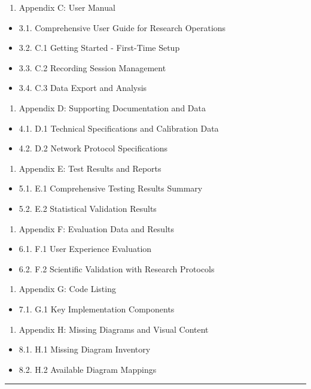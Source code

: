 \documentclass[11pt,a4paper]{article}
\begin{document}
\begin{enumerate}
\item Appendix C: User Manual
\end{enumerate}
\begin{itemize}
\item 3.1. Comprehensive User Guide for Research Operations
\item 3.2. C.1 Getting Started - First-Time Setup
\item 3.3. C.2 Recording Session Management
\item 3.4. C.3 Data Export and Analysis
\end{itemize}
\begin{enumerate}
\item Appendix D: Supporting Documentation and Data
\end{enumerate}
\begin{itemize}
\item 4.1. D.1 Technical Specifications and Calibration Data
\item 4.2. D.2 Network Protocol Specifications
\end{itemize}
\begin{enumerate}
\item Appendix E: Test Results and Reports
\end{enumerate}
\begin{itemize}
\item 5.1. E.1 Comprehensive Testing Results Summary
\item 5.2. E.2 Statistical Validation Results
\end{itemize}
\begin{enumerate}
\item Appendix F: Evaluation Data and Results
\end{enumerate}
\begin{itemize}
\item 6.1. F.1 User Experience Evaluation
\item 6.2. F.2 Scientific Validation with Research Protocols
\end{itemize}
\begin{enumerate}
\item Appendix G: Code Listing
\end{enumerate}
\begin{itemize}
\item 7.1. G.1 Key Implementation Components
\end{itemize}
\begin{enumerate}
\item Appendix H: Missing Diagrams and Visual Content
\end{enumerate}
\begin{itemize}
\item 8.1. H.1 Missing Diagram Inventory
\item 8.2. H.2 Available Diagram Mappings

\end{itemize}
\hrule
\end{document}
